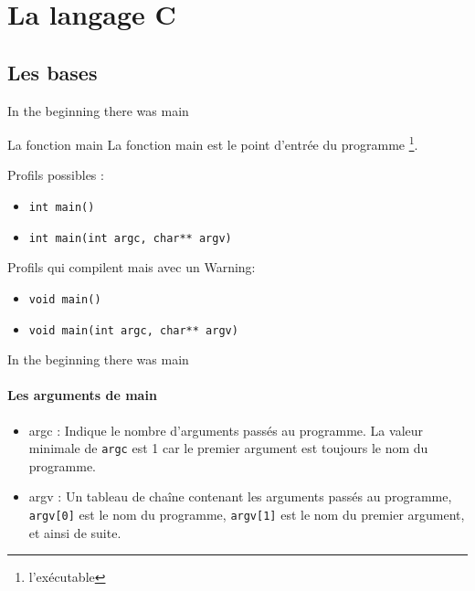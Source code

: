   	\section{La langage C}
  	\subsection{Les bases}
  	\begin{frame}{In the beginning there was main}
  		\begin{block}{La fonction main}
  			La fonction \alert{main} est le point d'entrée du programme \footnote[frame]{l'exécutable}.
  		\end{block}
  		\begin{exampleblock}{Profils possibles :}
  			\begin{itemize}
  				\item \texttt{int main()}
  				\item \texttt{int main(int argc, char** argv)}
  			\end{itemize}
  		\end{exampleblock}
  		\begin{alertblock}{Profils qui compilent mais avec un Warning:}
  			\begin{itemize}
	  			\item \texttt{void main()}
	  			\item \texttt{void main(int argc, char** argv)}
  			\end{itemize}
  		\end{alertblock}
  	\end{frame}
  
  	\begin{frame}{In the beginning there was main}
		\framesubtitle{Les arguments de main}
		\begin{itemize}
			\item \alert{argc} : Indique le nombre d'arguments passés au programme. La valeur minimale de \texttt{argc} est 1 car le premier argument est toujours le nom du programme.
			\item \alert{argv} : Un tableau de chaîne contenant les arguments passés au programme, \texttt{argv[0]} est le nom du programme, \texttt{argv[1]} est le nom du premier argument, et ainsi de suite.
		\end{itemize}
  	\end{frame}
  
